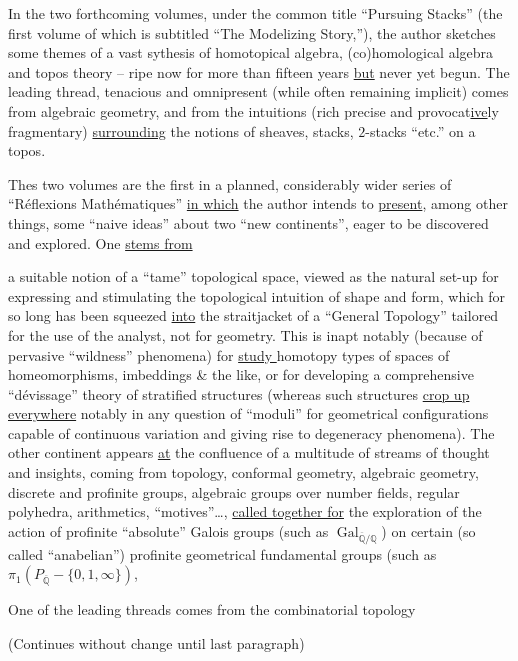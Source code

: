 In the two forthcoming volumes, under the common title ``Pursuing Stacks'' (the first volume of which is subtitled ``The Modelizing Story,''), the author sketches some themes of a vast sythesis of homotopical algebra, (co)homological algebra and topos theory -- ripe now for more than fifteen years \uline{but} never yet begun. The leading thread, tenacious and omnipresent (while often remaining implicit) comes from algebraic geometry, and from the intuitions (rich precise and provocat\uline{ive}ly fragmentary) \uline{surrounding} the notions of sheaves, stacks, $2$-stacks ``etc.'' on a topos.

Thes two volumes are the first in a planned, considerably wider series of ``Réflexions Mathématiques'' \uline{in which} the author intends to \uline{present}, among other things, some ``naive ideas'' about two ``new continents'', eager to be discovered and explored. One \uline{stems from}

a suitable notion of a ``tame'' topological space, viewed as the natural set-up for expressing and stimulating the topological intuition of shape and form, which for so long has been squeezed \uline{into} the straitjacket of a ``General Topology'' tailored for the use of the analyst, not for geometry. This is inapt notably (because of pervasive ``wildness'' phenomena) for \uline{ study } homotopy types of spaces of homeomorphisms, imbeddings \& the like, or for developing a comprehensive ``dévissage'' theory of stratified structures (whereas such structures  \uline{crop up everywhere} notably in any question of ``moduli'' for geometrical configurations capable of continuous variation and giving rise to degeneracy phenomena). The other continent appears \uline{at} the confluence of a multitude of streams of thought and insights, coming from topology, conformal geometry, algebraic geometry, discrete and profinite groups, algebraic groups over number fields, regular polyhedra, arithmetics, ``motives''\ldots, \uline{called together for} the exploration of the action of profinite ``absolute'' Galois groups (such as $\operatorname{Gal}_{\overline{\mathbb{Q}}/\mathbb{Q}}$) on certain (so called ``anabelian'') profinite geometrical fundamental groups (such as $\pi_{1}(P_{\overline{\mathbb{Q}}}-\{0,1,\infty\})$,

One of the leading threads comes from the combinatorial topology

(Continues without change until last paragraph)

